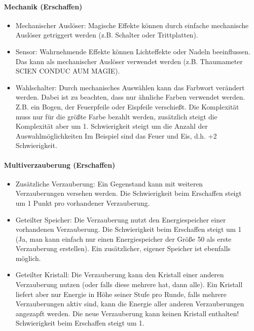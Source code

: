\documentclass{article}
\begin{document}
\paragraph{Mechanik (Erschaffen)}

\begin{itemize}
\item Mechanischer Auslöser: Magische Effekte können durch einfache mechanische Auslöser getriggert werden (z.B. Schalter oder Trittplatten).
\item Sensor: Wahrnehmende Effekte können Lichteffekte oder Nadeln beeinflussen. Das kann als mechanischer Auslöser verwendet werden (z.B. Thaumameter SCIEN CONDUC AUM MAGIE).
\item Wahlschalter: Durch mechanisches Auswählen kann das Farbwort verändert werden. Dabei ist zu beachten, dass nur ähnliche Farben verwendet werden. Z.B. ein Bogen, der Feuerpfeile oder Eispfeile verschießt. Die Komplexität muss nur für die größte Farbe bezahlt werden, zusätzlich steigt die Komplexität aber um 1. Schwierigkeit steigt um die Anzahl der Auswahlmöglichkeiten  Im Beispiel sind das Feuer und Eis, d.h. +2 Schwierigkeit.
\end{itemize}

\paragraph{Multiverzauberung (Erschaffen)}

\begin{itemize}
\item Zusätzliche Verzauberung: Ein Gegenstand kann mit weiteren Verzauberungen versehen werden. Die Schwierigkeit beim Erschaffen steigt um 1 Punkt pro vorhandener Verzauberung.
\item Geteilter Speicher: Die Verzauberung nutzt den Energiespeicher einer vorhandenen Verzauberung. Die Schwierigkeit beim Erschaffen steigt um 1 (Ja, man kann einfach nur einen Energiespeicher der Größe 50 als erste Verzauberung erstellen). Ein zusätzlicher, eigener Speicher ist ebenfalls möglich.
\item Geteilter Kristall: Die Verzauberung kann den Kristall einer anderen Verzauberung nutzen (oder falls diese mehrere hat, dann alle). Ein Kristall liefert aber nur Energie in Höhe seiner Stufe pro Runde, falls mehrere Verzauberungen aktiv sind, kann die Energie aller anderen Verzauberungen angezapft werden. Die neue Verzauberung kann keinen Kristall enthalten! Schwierigkeit beim Erschaffen steigt um 1.
\end{itemize}
\end{document}

